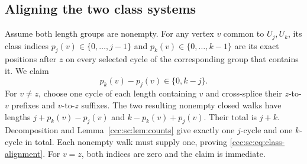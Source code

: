 \documentclass[11pt,letterpaper]{article}
\theoremstyle{definition}
\theoremstyle{remark}
\begin{document}
\subsection{Aligning the two class systems}

Assume both length groups are nonempty. For any vertex $v$ common to $U_j,U_k$, its class indices $p_j(v)\in\{0,\ldots,j-1\}$ and $p_k(v)\in\{0,\ldots,k-1\}$ are its exact positions after $z$ on every selected cycle of the corresponding group that contains it. We claim
\begin{equation}\label{ccc:sc:eq:class-alignment}
 p_k(v)-p_j(v)\in\{0,k-j\}.
\end{equation}
For $v\ne z$, choose one cycle of each length containing $v$ and cross-splice their $z$-to-$v$ prefixes and $v$-to-$z$ suffixes. The two resulting nonempty closed walks have lengths $j+p_k(v)-p_j(v)$ and $k-p_k(v)+p_j(v)$. Their total is $j+k$. Decomposition and Lemma~\ref{ccc:sc:lem:counts} give exactly one $j$-cycle and one $k$-cycle in total. Each nonempty walk must supply one, proving \eqref{ccc:sc:eq:class-alignment}. For $v=z$, both indices are zero and the claim is immediate.
\end{document}
